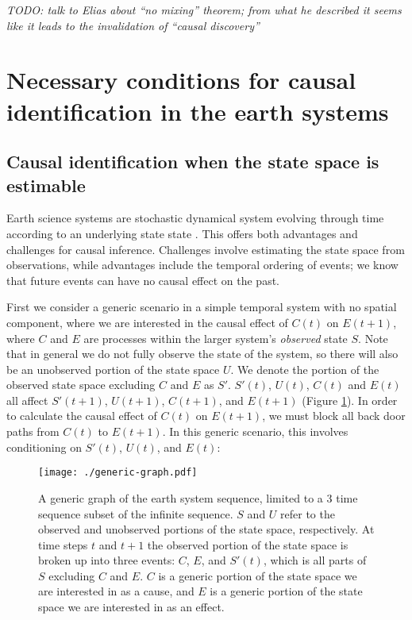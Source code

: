 \documentclass[12pt]{article}
\begin{document}
\textit{
  TODO: talk to Elias about ``no mixing'' theorem; from what he
  described it seems like it leads to the invalidation of ``causal
  discovery''
}
\section{Necessary conditions for causal identification in the earth
  systems}
\label{sec:necess-cond-caus}
\subsection{Causal identification when the state space is estimable}
\label{state-space}

Earth science systems are stochastic dynamical system evolving through
time according to an underlying state state \citep{majda-state}. This
offers both advantages and challenges for causal inference. Challenges
involve estimating the state space from observations, while advantages
include the temporal ordering of events; we know that future events
can have no causal effect on the past.

First we consider a generic scenario in a simple temporal system with
no spatial component, where we are interested in the causal effect of
$C(t)$ on $E(t+1)$, where $C$ and $E$ are processes within the larger
system's \textit{observed} state $S$. Note that in general we do not
fully observe the state of the system, so there will also be an
unobserved portion of the state space $U$. We denote the portion of
the observed state space excluding $C$ and $E$ as $S'$. $S'(t)$,
$U(t)$, $C(t)$ and $E(t)$ all affect $S'(t+1)$, $U(t+1)$, $C(t+1)$,
and $E(t+1)$ (Figure \ref{fig:generic}). In order to calculate the
causal effect of $C(t)$ on $E(t+1)$, we must block all back door paths
from $C(t)$ to $E(t+1)$. In this generic scenario, this involves
conditioning on $S'(t)$, $U(t)$, and $E(t)$:

\begin{figure}
  \texttt{[image: ./generic-graph.pdf]}
  \caption{A generic graph of the earth system sequence, limited to a
    3 time sequence subset of the infinite sequence. $S$ and $U$ refer
    to the observed and unobserved portions of the state space,
    respectively.  At time steps $t$ and $t+1$ the observed portion
    of the state space is broken up into three events: $C$, $E$, and
    $S'(t)$, which is all parts of $S$ excluding $C$ and $E$. $C$ is a
    generic portion of the state space we are interested in as a cause, and $E$ is
    a generic portion of the state space we are interested in as an effect.}
  \label{fig:generic}
\end{figure}
\end{document}
